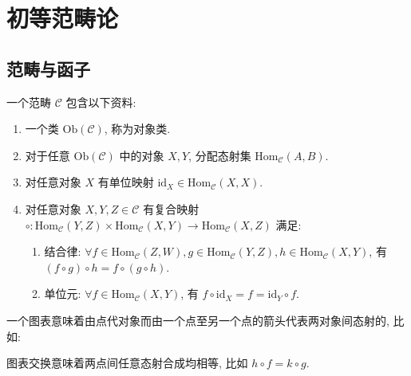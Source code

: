 \section{初等范畴论}

\subsection{范畴与函子}

\begin{definition}[范畴]
    \label {definition:category}
    一个范畴 \(\mathcal{C}\) 包含以下资料:

    \begin{enumerate}
        \item 一个类 \(\mathrm{Ob} (\mathcal{C})\), 称为对象类.
        \item 对于任意 \(\mathrm{Ob} (\mathcal{C})\) 中的对象 \(X,Y\), 分配态射集 \(\mathrm{Hom}_{\mathcal{C}} (A,B)\).
        \item 对任意对象 \(X\) 有单位映射 \(\mathrm{id}_X \in \mathrm{Hom}_{\mathcal{C}} (X,X)\).
        \item 对任意对象 \(X,Y,Z \in \mathcal{C}\) 有复合映射 \(\circ : \mathrm{Hom}_{\mathcal{C}} (Y,Z) \times \mathrm{Hom}_{\mathcal{C}} (X,Y) \to \mathrm{Hom}_{\mathcal{C}} (X,Z)\) 满足:
        \begin{enumerate}
            \item 结合律: \(\forall f \in \mathrm{Hom}_{\mathcal{C}} (Z,W), g \in \mathrm{Hom}_{\mathcal{C}} (Y,Z), h \in \mathrm{Hom}_{\mathcal{C}} (X,Y)\), 有 \((f \circ g) \circ h = f \circ (g \circ h)\).
            \item 单位元: \(\forall f \in \mathrm{Hom}_{\mathcal{C}} (X,Y)\), 有 \(f \circ \mathrm{id}_X = f = \mathrm{id}_Y \circ f\).
        \end{enumerate}
    \end{enumerate}
\end{definition}

\begin{definition}[交换图表]
    一个图表意味着由点代对象而由一个点至另一个点的箭头代表两对象间态射的, 比如:
    \begin{center}
    \end{center}
    图表交换意味着两点间任意态射合成均相等, 比如 \(h \circ f = k \circ g\).
\end{definition}

